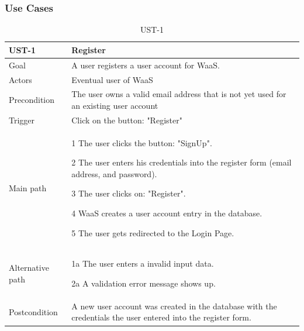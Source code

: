 \documentclass[titlepage, 12pt]{article}
\newenvironment{packed_itemize}{
  \vspace{-\topsep}
  \begin{itemize}
    \setlength{\itemsep}{1pt}
    \setlength{\parskip}{0pt}
    \setlength{\parsep}{0pt}
  }{\end{itemize}}
\begin{document}
\subsubsection{{Use Cases}}

\begin{table}[H]
  \begin{center}

    \begin{tabular}{p{4cm}|p{10cm}}
      \textbf{UST-1}   & \textbf{Register}                                                                                            \\
      \hline
      Goal             & A user registers a user account for WaaS.                                                                    \\
      \hline
      Actors           & Eventual user of WaaS                                                                                        \\
      \hline
      Precondition     & The user owns a valid email address that is not yet used for an existing user account                        \\
      \hline
      Trigger          & Click on the button: "Register"                                                                              \\
      \hline
      Main path        &
      \begin{packed_itemize}
        \item [1] The user clicks the button: "SignUp".
        \item [2] The user enters his credentials into the register form (email address, and password).
        \item [3] The user clicks on: "Register".
        \item [4] WaaS creates a user account entry in the database.
        \item [5] The user gets redirected to the Login Page.
      \end{packed_itemize}                                                                                                       \\
      \hline
      Alternative path &
      \begin{packed_itemize}
        \item [1a] The user enters a invalid input data.
        \item [2a] A validation error message shows up.
      \end{packed_itemize}                                                                                                       \\
      \hline
      Postcondition    & A new user account was created in the database with the credentials the user entered into the register form. \\
    \end{tabular}

    \caption{UST-1}
    \label{table:UST-1}

  \end{center}
\end{table}
\end{document}

